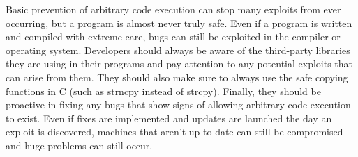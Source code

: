Basic prevention of arbitrary code execution can stop many exploits from ever occurring, but a program is almost never truly safe. Even if a program is written and compiled with extreme care, bugs can still be exploited in the compiler or operating system. Developers should always be aware of the third-party libraries they are using in their programs and pay attention to any potential exploits that can arise from them. They should also make sure to always use the safe copying functions in C (such as strncpy instead of strcpy). Finally, they should be proactive in fixing any bugs that show signs of allowing arbitrary code execution to exist. Even if fixes are implemented and updates are launched the day an exploit is discovered, machines that aren’t up to date can still be compromised and huge problems can still occur.